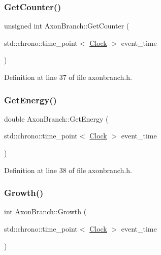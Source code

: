 \subsubsection{\texorpdfstring{Get\+Counter()}{GetCounter()}}
{\footnotesize\ttfamily unsigned int Axon\+Branch\+::\+Get\+Counter (\begin{DoxyParamCaption}\item[{std\+::chrono\+::time\+\_\+point$<$ \mbox{\hyperlink{universe_8h_a0ef8d951d1ca5ab3cfaf7ab4c7a6fd80}{Clock}} $>$}]{event\+\_\+time }\end{DoxyParamCaption})\hspace{0.3cm}{\ttfamily [inline]}}



Definition at line 37 of file axonbranch.\+h.

\mbox{\label{class_axon_branch_a688ec51cd5116e9aebe9b4d3c5c7f2b1}} 
\subsubsection{\texorpdfstring{Get\+Energy()}{GetEnergy()}}
{\footnotesize\ttfamily double Axon\+Branch\+::\+Get\+Energy (\begin{DoxyParamCaption}\item[{std\+::chrono\+::time\+\_\+point$<$ \mbox{\hyperlink{universe_8h_a0ef8d951d1ca5ab3cfaf7ab4c7a6fd80}{Clock}} $>$}]{event\+\_\+time }\end{DoxyParamCaption})\hspace{0.3cm}{\ttfamily [inline]}}



Definition at line 38 of file axonbranch.\+h.

\mbox{\label{class_axon_branch_a6e434a57873ab0fdbc72cf7ecc7228ed}} 
\subsubsection{\texorpdfstring{Growth()}{Growth()}}
{\footnotesize\ttfamily int Axon\+Branch\+::\+Growth (\begin{DoxyParamCaption}\item[{std\+::chrono\+::time\+\_\+point$<$ \mbox{\hyperlink{universe_8h_a0ef8d951d1ca5ab3cfaf7ab4c7a6fd80}{Clock}} $>$}]{event\+\_\+time }\end{DoxyParamCaption})}



